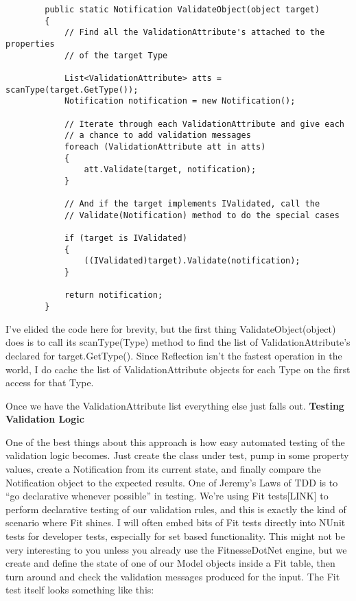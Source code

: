 \documentclass{article}
\begin{document}
{ \begin{lstlisting}
        public static Notification ValidateObject(object target)
        {
            // Find all the ValidationAttribute's attached to the properties
            // of the target Type

            List<ValidationAttribute> atts = scanType(target.GetType());
            Notification notification = new Notification();

            // Iterate through each ValidationAttribute and give each
            // a chance to add validation messages
            foreach (ValidationAttribute att in atts)
            {
                att.Validate(target, notification);
            }

            // And if the target implements IValidated, call the
            // Validate(Notification) method to do the special cases

            if (target is IValidated)
            {
                ((IValidated)target).Validate(notification);
            }
			
            return notification;
        }
\end{lstlisting}

I've elided the code here for brevity, but the first thing ValidateObject(object) does is to call its scanType(Type) method to find the list of ValidationAttribute's declared for target.GetType().  Since Reflection isn't the fastest operation in the world, I do cache the list of ValidationAttribute objects for each Type on the first access for that Type. 

Once we have the ValidationAttribute list everything else just falls out.
\Large {\textbf{Testing Validation Logic}}

One of the best things about this approach is how easy automated testing of the validation logic becomes.  Just create the class under test, pump in some property values, create a Notification from its current state, and finally compare the Notification object to the expected results.  One of Jeremy's Laws of TDD is to “go declarative whenever possible” in testing.  We're using Fit tests[LINK] to perform declarative testing of our validation rules, and this is exactly the kind of scenario where Fit shines.  I will often embed bits of Fit tests directly into NUnit tests for developer tests, especially for set based functionality.  This might not be very interesting to you unless you already use the FitnesseDotNet engine, but we create and define the state of one of our Model objects inside a Fit table, then turn around and check the validation messages produced for the input.  The Fit test itself looks something like this:

}
\end{document}
